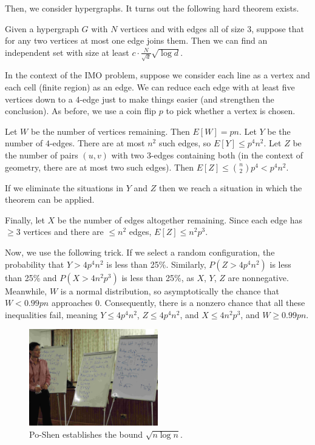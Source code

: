 \documentclass[11pt]{scrreprt}
\numberwithin{figure}{chapter}
\begin{document}
Then, we consider hypergraphs. It turns out the following hard theorem exists.
\begin{theorem*}
  Given a hypergraph $G$ with $N$ vertices and with edges all of size $3$, suppose that for any two vertices at most one edge joins them.
  Then we can find an independent set with size at least $c \cdot \frac{N}{\sqrt d} \sqrt{\log d}$.
\end{theorem*}
In the context of the IMO problem, suppose we consider each line as a vertex and each cell (finite region) as an edge.
We can reduce each edge with at least five vertices down to a $4$-edge just to make things easier (and strengthen the conclusion).
As before, we use a coin flip $p$ to pick whether a vertex is chosen.
\begin{itemize}
  \ii Let $W$ be the number of vertices remaining. Then $E[W] = pn$.
  \ii Let $Y$ be the number of $4$-edges. There are at most $n^2$ such edges, so $E[Y] \le p^4n^2$.
  \ii Let $Z$ be the number of pairs $(u,v)$ with two $3$-edges containing both (in the context of geometry, there are at most two such edges).
  Then $E[Z] \le \binom n2 p^4 < p^4n^2$.
\end{itemize}
If we eliminate the situations in $Y$ and $Z$ then we reach a situation in which the theorem can be applied.

Finally, let $X$ be the number of edges altogether remaining. Since each edge has $\ge 3$ vertices and there are $\le n^2$ edges, $E[Z] \le n^2p^3$.

Now, we use the following trick. If we select a random configuration, the probability that $Y > 4p^4n^2$ is less than 25\%. Similarly, $P(Z > 4p^4n^2)$ is less than 25\% and $P(X > 4n^2p^3)$ is less than 25\%, as $X$, $Y$, $Z$ are nonnegative.  Meanwhile, $W$ is a normal distribution, so asymptotically the chance that $W < 0.99pn$ approaches $0$.
Consequently, there is a nonzero chance that all these inequalities fail, meaning $Y \le 4p^4n^2$, $Z \le 4p^4n^2$, and $X \le 4n^2p^3$, and $W \ge 0.99pn$.

\begin{figure}[ht]
  \centering
  \includegraphics[width=0.5\textwidth]{media/po2.jpg}
  \caption{Po-Shen establishes the bound $\sqrt{n \log n}$.}
\end{figure}
\end{document}
